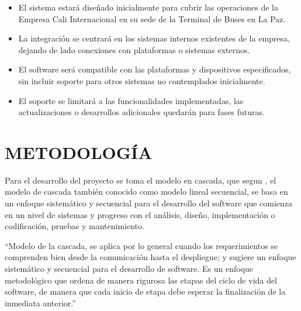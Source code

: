 \documentclass[12pt,letterpaper]{article}
\begin{document}
\begin{itemize}[label=$\bullet$, left=0cm, labelsep = 1.05cm, topsep = 0pt, parsep = 0pt]

	\item El sistema estará diseñado inicialmente para cubrir las operaciones de la Empresa Cali Internacional en su sede de la Terminal de Buses en La Paz.
	
	\item La integración se centrará en los sistemas internos existentes de la empresa, dejando de lado conexiones con plataformas o sistemas externos.
	
	\item El software será compatible con las plataformas y dispositivos especificados, sin incluir soporte para otros sistemas no contemplados inicialmente.
	
	\item El soporte se limitará a las funcionalidades implementadas, las actualizaciones o desarrollos adicionales quedarán para fases futuras.

	
\end{itemize}


\section{METODOLOGÍA}

Para el desarrollo del proyecto se toma el modelo en cascada, que segun \cite{pressman1998ingenieria}, el modelo de cascada también conocido como modelo lineal secuencial, se basa en un enfoque sistemático y secuencial para el desarrollo del software que comienza en un nivel de sistemas y progreso con el análisis, diseño, implementación o codificación, pruebas y mantenimiento.

“Modelo de la cascada, se aplica por lo general cuando los requerimientos se
comprenden bien desde la comunicación hasta el despliegue; y sugiere un enfoque sistemático y secuencial para el desarrollo de software. Es un enfoque metodológico que ordena de manera rigurosa las etapas del ciclo de vida del software, de manera que cada inicio de etapa debe esperar la finalización de la inmediata anterior.” \parencite{pressman2010ingenieria}
\end{document}
